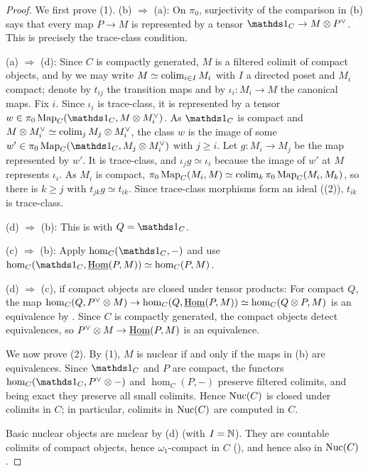 	\begin{proof}
		We first prove (1). (b) $\Rightarrow$ (a): On $\pi_0$, surjectivity of the comparison in (b) says that every map $P\to M$ is represented by a tensor $\unit_C\to M\otimes P^\vee$. This is precisely the trace-class condition.

		(a) $\Rightarrow$ (d): Since $C$ is compactly generated, $M$ is a filtered colimit of compact objects, and by  we may write $M \simeq \operatorname{colim}_{i \in I} M_i$ with $I$ a directed poset and $M_i$ compact; denote by $t_{ij}$ the transition maps and by $\iota_i\colon M_i \to M$ the canonical maps. Fix $i$. Since $\iota_i$ is trace-class, it is represented by a tensor $w \in \pi_0\Map_C(\unit_C, M \otimes M_i^{\vee})$. As $\unit_C$ is compact and $M \otimes M_i^{\vee} \simeq \operatorname{colim}_j M_j \otimes M_i^{\vee}$, the class $w$ is the image of some $w' \in \pi_0\Map_C(\unit_C, M_j \otimes M_i^{\vee})$ with $j \geq i$. Let $g\colon M_i\to M_j$ be the map represented by $w'$. It is trace-class, and $\iota_jg\simeq\iota_i$ because the image of $w'$ at $M$ represents $\iota_i$. As $M_i$ is compact, $\pi_0\operatorname{Map}_C(M_i,M) \simeq \operatorname{colim}_k \pi_0\operatorname{Map}_C(M_i,M_k)$, so there is $k \geq j$ with $t_{jk}g \simeq t_{ik}$. Since trace-class morphisms form an ideal ((2)), $t_{ik}$ is trace-class.

		(d) $\Rightarrow$ (b): This is  with $Q = \unit_C$.

		(c) $\Rightarrow$ (b): Apply $\hom_C(\unit_C,-)$ and use $\hom_C(\unit_C,\iHom(P,M)) \simeq \hom_C(P,M)$.

		(d) $\Rightarrow$ (c), if compact objects are closed under tensor products: For compact $Q$, the map $\hom_C(Q,P^{\vee} \otimes M) \to \hom_C(Q,\operatorname{\underline{\operatorname{Hom}}}(P,M)) \simeq \hom_C(Q \otimes P,M)$ is an equivalence by . Since $C$ is compactly generated, the compact objects detect equivalences, so $P^{\vee} \otimes M \to \operatorname{\underline{\operatorname{Hom}}}(P,M)$ is an equivalence.

		We now prove (2). By (1), $M$ is nuclear if and only if the maps in (b) are equivalences. Since $\unit_C$ and $P$ are compact, the functors $\hom_C(\unit_C,P^{\vee} \otimes -)$ and $\hom_C(P,-)$ preserve filtered colimits, and being exact they preserve all small colimits. Hence $\operatorname{Nuc}(C)$ is closed under colimits in $C$; in particular, colimits in $\operatorname{Nuc}(C)$ are computed in $C$.

		Basic nuclear objects are nuclear by (d) (with $I = \operatorname{\mathbb N}$). They are countable colimits of compact objects, hence $\omega_1$-compact in $C$ (), and hence also in $\operatorname{Nuc}(C)$.


\end{proof}

